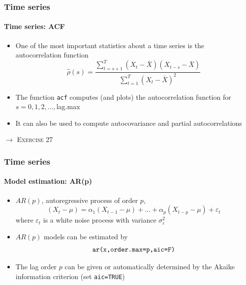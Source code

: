 \documentclass[title={Introduction to R}, author={Mutschler and Zaharieva}, inst={Institute for Econometrics and Empirical Economics}]{beamer}
\begin{document}
\begin{frame}
	\frametitle{Time series}	
	\framesubtitle{Time series: ACF}	
	\begin{itemize}
		\item One of the most important statistics about a time series is the
		autocorrelation function
		\begin{equation*}
		\hat{\rho}(s)=\frac{\sum_{t=s+1}^{T}\left( X_{t}-\bar{X}\right) \left(
			X_{t-s}-\bar{X}\right) }{\sum_{t=1}^{T}\left( X_{t}-\bar{X}\right) ^{2}}
		\end{equation*}		
		\item The function \texttt{acf} computes (and plots) the autocorrelation
		function for $s=0,1,2,\ldots ,$lag.max		
		\item It can also be used to compute autocovariance and partial
		autocorrelations
	\end{itemize}\pause
	$\longrightarrow $ \textsc{Exercise 27}
\end{frame}


\begin{frame}
	\frametitle{Time series}	
	\framesubtitle{Model estimation: AR(p)}	
	\begin{itemize}
		\item $AR(p)$, autoregressive process of order $p$,
		\begin{equation*}
		\left( X_{t}-\mu \right) =\alpha _{1}\left( X_{t-1}-\mu \right) +\ldots
		+\alpha _{p}\left( X_{t-p}-\mu \right) +\varepsilon _{t}
		\end{equation*}%
		where $\varepsilon _{t}$ is a white noise process with variance $\sigma
		_{\varepsilon }^{2}$		
		\item $AR(p)$ models can be estimated by
		\begin{equation*}
		\text{\texttt{ar(x,order.max=p,aic=F)}}
		\end{equation*}		
		\item The lag order $p$ can be given or automatically determined by the
		Akaike information criterion (set \texttt{aic=TRUE})
	\end{itemize}
\end{frame}
\end{document}
